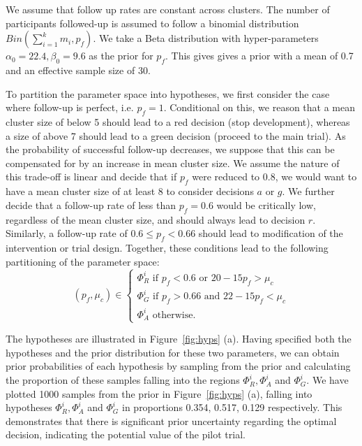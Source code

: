 \documentclass{article} %
\begin{document}
We assume that follow up rates are constant across clusters. The number of participants followed-up is assumed to follow a binomial distribution $Bin(\sum_{i=1}^{k} m_{i}, p_{f})$. We take a Beta distribution with hyper-parameters $\alpha_{0} = 22.4, \beta_{0} = 9.6$ as the prior for $p_{f}$. This gives gives a prior with a mean of 0.7 and an effective sample size of 30.

To partition the parameter space into hypotheses, we first consider the case where follow-up is perfect, i.e. $p_{f} = 1$. Conditional on this, we reason that a mean cluster size of below 5 should lead to a red decision (stop development), whereas a size of above 7 should lead to a green decision (proceed to the main trial). As the probability of successful follow-up decreases, we suppose that this can be compensated for by an increase in mean cluster size. We assume the nature of this trade-off is linear and decide that if $p_{f}$ were reduced to 0.8, we would want to have a mean cluster size of at least 8 to consider decisions $a$ or $g$.  We further decide that a follow-up rate of less than $p_{f} = 0.6$ would be critically low, regardless of the mean cluster size, and should always lead to decision $r$. Similarly, a follow-up rate of $0.6 \leq p_{f} < 0.66$ should lead to modification of the intervention or trial design. Together, these conditions lead to the following partitioning of the parameter space:
\begin{equation}
  (p_{f}, \mu_{c}) \in \begin{cases}
               \Phi^i_R \text{ if } p_{f} < 0.6 \text{ or } 20-15p_{f} > \mu_{c} \\
               \Phi^i_G \text{ if } p_{f} > 0.66 \text{ and } 22-15p_{f} < \mu_{c} \\
               \Phi^i_A \text{ otherwise.}
            \end{cases}
\end{equation}

The hypotheses are illustrated in Figure~\ref{fig:hyps} (a). Having specified both the hypotheses and the prior distribution for these two parameters, we can obtain prior probabilities of each hypothesis by sampling from the prior and calculating the proportion of these samples falling into the regions $\Phi^i_R, \Phi^i_A$ and $\Phi^i_G$. We have plotted 1000 samples from the prior in Figure~\ref{fig:hyps} (a), falling into hypotheses  $\Phi^i_R, \Phi^i_A$ and $\Phi^i_G$ in proportions 0.354, 0.517, 0.129 respectively. This demonstrates that there is significant prior uncertainty regarding the optimal decision, indicating the potential value of the pilot trial.
\end{document}
